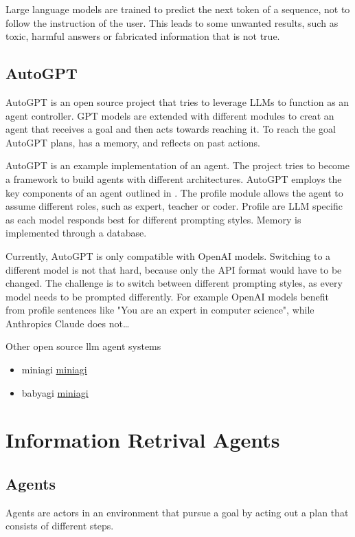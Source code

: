 \documentclass[english, version-2022-01]{uzl-thesis}
\begin{document}
Large language models are trained to predict the next token of a sequence, not to follow the instruction of the user. This leads to some unwanted results, such as toxic, harmful answers or fabricated information that is not true.

\subsection{AutoGPT}

AutoGPT is an open source project that tries to leverage LLMs to function as an agent controller. GPT models are extended with different modules to creat an agent that receives a goal and then acts towards reaching it. To reach the goal AutoGPT plans, has a memory, and reflects on past actions.

AutoGPT is an example implementation of an agent. The project tries to become a framework to build agents with different architectures.
AutoGPT employs the key components of an agent outlined in \cite{Wang2023}. The profile module allows the agent to assume different roles, such as expert, teacher or coder. Profile are LLM specific as each model responds best for different prompting styles. Memory is implemented through a database.

Currently, AutoGPT is only compatible with OpenAI models. Switching to a different model is not that hard, because only the API format would have to be changed. The challenge is to switch between different prompting styles, as every model needs to be prompted differently. For example OpenAI models benefit from profile sentences like "You are an expert in computer science", while Anthropics Claude does not\dots

Other open source llm agent systems
\begin{itemize}
	\item miniagi \href{}{miniagi}
	\item babyagi \href{https://github.com/yoheinakajima/babyagi}{miniagi}
\end{itemize}
\section{Information Retrival Agents}

\subsection{Agents}

Agents are actors in an environment that pursue a goal by acting out a plan that consists of different steps.
\end{document}
